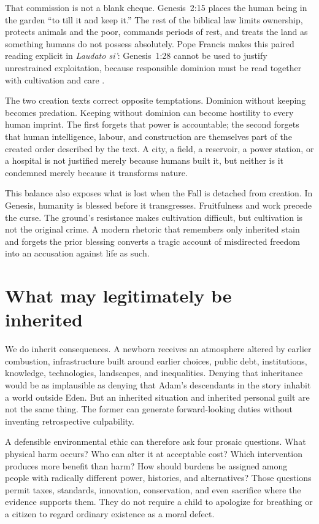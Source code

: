 ﻿\documentclass[12pt,a4paper]{book}
\begin{document}
That commission is not a blank cheque.  Genesis~2:15 places the human being in
the garden ``to till it and keep it.''  The rest of the biblical law limits
ownership, protects animals and the poor, commands periods of rest, and treats
the land as something humans do not possess absolutely.  Pope Francis makes
this paired reading explicit in \emph{Laudato si'}: Genesis~1:28 cannot be used
to justify unrestrained exploitation, because responsible dominion must be
read together with cultivation and care \cite[para.~67]{FrancisLaudatoSi2015}.

The two creation texts correct opposite temptations.  Dominion without keeping
becomes predation.  Keeping without dominion can become hostility to every
human imprint.  The first forgets that power is accountable; the second
forgets that human intelligence, labour, and construction are themselves part
of the created order described by the text.  A city, a field, a reservoir, a
power station, or a hospital is not justified merely because humans built it,
but neither is it condemned merely because it transforms nature.

This balance also exposes what is lost when the Fall is detached from creation.
In Genesis, humanity is blessed before it transgresses.  Fruitfulness and work
precede the curse.  The ground's resistance makes cultivation difficult, but
cultivation is not the original crime.  A modern rhetoric that remembers only
inherited stain and forgets the prior blessing converts a tragic account of
misdirected freedom into an accusation against life as such.

\section{What may legitimately be inherited}

We do inherit consequences.  A newborn receives an atmosphere altered by
earlier combustion, infrastructure built around earlier choices, public debt,
institutions, knowledge, technologies, landscapes, and inequalities.  Denying
that inheritance would be as implausible as denying that Adam's descendants in
the story inhabit a world outside Eden.  But an inherited situation and
inherited personal guilt are not the same thing.  The former can generate
forward-looking duties without inventing retrospective culpability.

A defensible environmental ethic can therefore ask four prosaic questions.
What physical harm occurs?  Who can alter it at acceptable cost?  Which
intervention produces more benefit than harm?  How should burdens be assigned
among people with radically different power, histories, and alternatives?
Those questions permit taxes, standards, innovation, conservation, and even
sacrifice where the evidence supports them.  They do not require a child to
apologize for breathing or a citizen to regard ordinary existence as a moral
defect.
\end{document}

